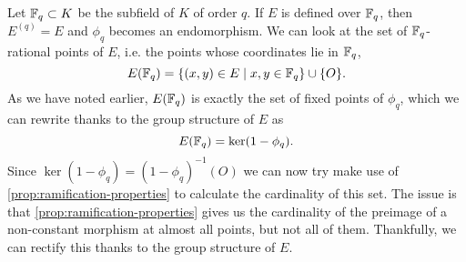 Let $\mathbb{F}_q \subset K$ be the subfield of $K$ of order $q$.
If $E$ is defined over $\mathbb{F}_q$,
then $E^{(q)} = E$ and $\phi_q$ becomes an endomorphism. 
We can look at the set of $\mathbb{F}_q$-rational points of $E$,
i.e. the points whose coordinates lie in $\mathbb{F}_q$,
\begin{equation*}
	E(\mathbb{F}_q) = \{(x, y) \in E\mid x,y \in \mathbb{F}_q\} \cup \{O\}.
\end{equation*}
As we have noted earlier, $E(\mathbb{F}_q)$ is exactly the set of fixed
points of $\phi_q$, which we can rewrite thanks to the group structure
of $E$ as
\begin{equation*}
	E(\mathbb{F}_q) = \ker(1 - \phi_q).
\end{equation*}
Since $\ker(1 - \phi_q) = (1 - \phi_q)^{-1}(O)$ we can now try make use of
\ref{prop:ramification-properties} to calculate the cardinality of this set.
The issue is that \ref{prop:ramification-properties} gives us the cardinality
of the preimage of a non-constant morphism at almost all points, but not
all of them.
Thankfully, we can rectify this thanks to the group structure of $E$.


